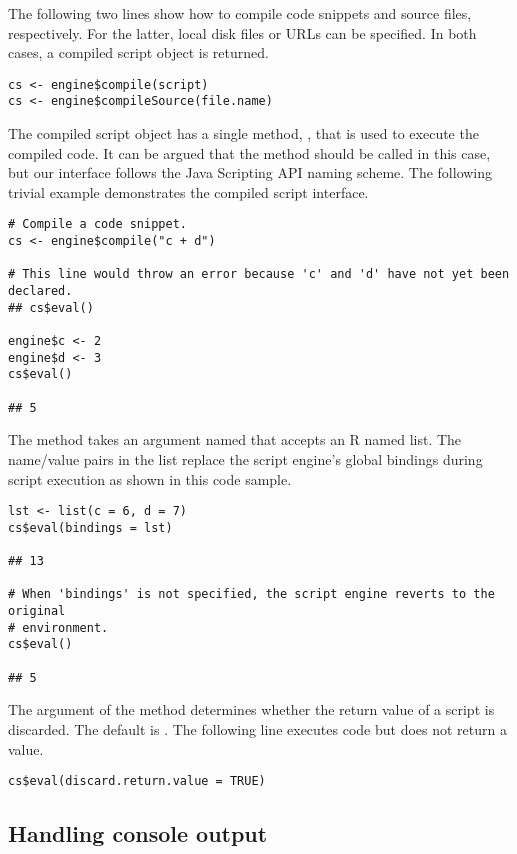 The following two lines show how to compile code snippets and source files, respectively. For the latter, local disk files or URLs can be specified. In both cases, a compiled script object is returned.

\begin{verbatim}
cs <- engine$compile(script)
cs <- engine$compileSource(file.name)
\end{verbatim}

The compiled script object has a single method, , that is used to execute the compiled code. It can be argued that the method should be called  in this case, but our interface follows the Java Scripting API naming scheme. The following trivial example demonstrates the compiled script interface.

\begin{verbatim}
# Compile a code snippet.
cs <- engine$compile("c + d")

# This line would throw an error because 'c' and 'd' have not yet been declared.
## cs$eval()

engine$c <- 2
engine$d <- 3
cs$eval()

## 5
\end{verbatim}

The  method takes an argument named  that accepts an R named list. The name/value pairs in the list replace the script engine's global bindings during script execution as shown in this code sample.
\begin{verbatim}
lst <- list(c = 6, d = 7)
cs$eval(bindings = lst)

## 13

# When 'bindings' is not specified, the script engine reverts to the original
# environment.
cs$eval()

## 5
\end{verbatim}

The  argument of the  method determines whether the return value of a script is discarded. The default is . The following line executes code but does not return a value.
\begin{verbatim}
cs$eval(discard.return.value = TRUE)
\end{verbatim}

\subsection{Handling console output}

